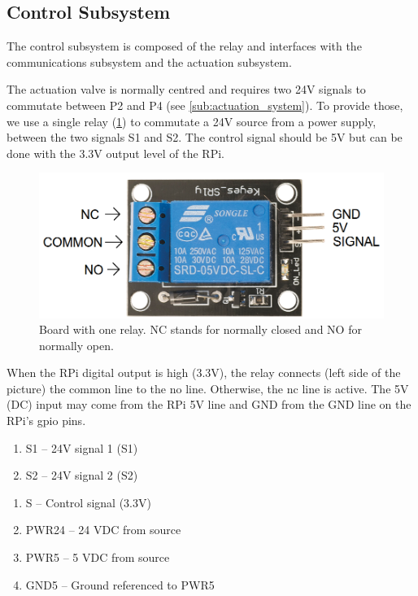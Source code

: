 \documentclass[twoside,a4paper]{refart}
\begin{document}
\subsection{Control Subsystem}
The control subsystem is composed of the relay and interfaces with the communications subsystem and the actuation subsystem.

 The actuation valve is normally centred and requires two 24V signals to commutate between P2 and P4 (see \cref{sub:actuation_system}). To provide those, we use a single relay (\cref{fig:relay_0}) to commutate a 24V source from a power supply, between the two signals S1 and S2. The control signal should be 5V but can be done with the 3.3V output level of the RPi.

\begin{figure}[H]
	\centering
	\includegraphics[width=0.7\linewidth]{relay_0}
	\caption{Board with one relay. NC stands for normally closed and NO for normally open.}
	\label{fig:relay_0}
\end{figure}

When the RPi digital output is high (3.3V), the relay connects (left side of the picture) the common line to the \gls{no} line. Otherwise, the \gls{nc} line is active.
The 5V (DC) input may come from the RPi 5V line and GND from the GND line on the RPi's \gls{gpio} pins.

\begin{enumerate}
	\item
	S1 -- 24V signal 1 (S1)
	\item
	S2 -- 24V signal 2 (S2)
\end{enumerate}

\begin{enumerate}
	\item
	 S -- Control signal (3.3V)
	\item PWR24 -- 24 VDC from source
	\item PWR5 -- 5 VDC from source
	\item GND5 -- Ground referenced to PWR5
\end{enumerate}
\end{document}

